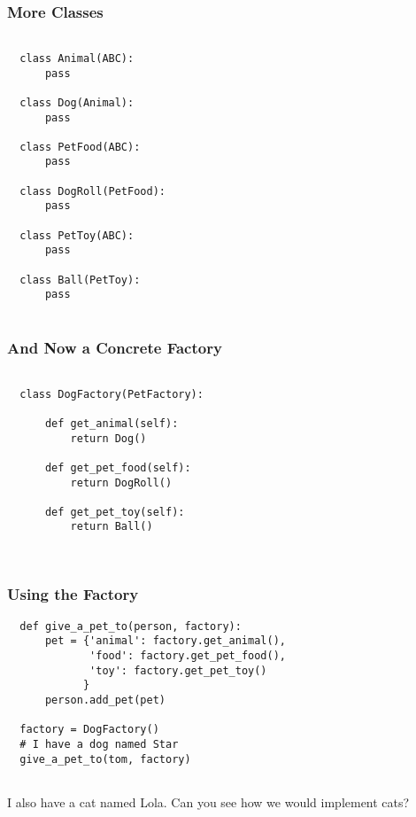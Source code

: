 \documentclass[10pt]{beamer}
\begin{document}
\begin{frame}[fragile]
  \frametitle{More Classes}

  
  \begin{verbatim}
  
  class Animal(ABC):
      pass
      
  class Dog(Animal):
      pass    
      
  class PetFood(ABC):
      pass
      
  class DogRoll(PetFood):
      pass    
      
  class PetToy(ABC):
      pass
      
  class Ball(PetToy):
      pass           
      
  \end{verbatim}
\end{frame}  
  
  
\begin{frame}[fragile]
  \frametitle{And Now a Concrete Factory}

  
  \begin{verbatim}
  
  class DogFactory(PetFactory):
  
      def get_animal(self):
          return Dog()
          
      def get_pet_food(self):
          return DogRoll()
          
      def get_pet_toy(self):
          return Ball()          

  
  \end{verbatim}
\end{frame} 
  
\begin{frame}[fragile]
  \frametitle{Using the Factory}

  
  \begin{verbatim}  
  def give_a_pet_to(person, factory):
      pet = {'animal': factory.get_animal(),
             'food': factory.get_pet_food(),
             'toy': factory.get_pet_toy()
            }
      person.add_pet(pet)
  
  factory = DogFactory()
  # I have a dog named Star
  give_a_pet_to(tom, factory)         
  
  \end{verbatim}
  
  I also have a cat named Lola. Can you see how we would implement cats?
\end{frame} 
\end{document}
